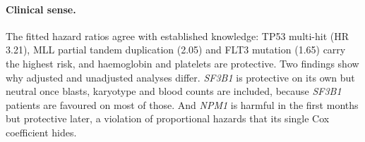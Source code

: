 \documentclass[11pt,a4paper]{article}
\begin{document}
\paragraph{Clinical sense.} The fitted hazard ratios agree with established knowledge:
TP53 multi-hit (HR 3.21), MLL partial tandem duplication (2.05) and FLT3 mutation (1.65)
carry the highest risk, and haemoglobin and platelets are protective. Two findings show why
adjusted and unadjusted analyses differ. \textit{SF3B1} is protective on its own but
neutral once blasts, karyotype and blood counts are included, because \textit{SF3B1}
patients are favoured on most of those. And \textit{NPM1} is harmful in the first months but
protective later, a violation of proportional hazards that its single Cox coefficient hides.

\end{document}
